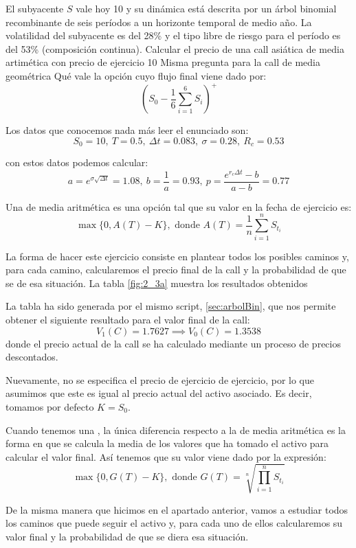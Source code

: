 \begin{problem}[3]
El subyacente $S$ vale hoy 10 y su dinámica está descrita por un árbol binomial recombinante de seis períodos a un horizonte temporal de medio año. La volatilidad del subyacente es del 28\% y el tipo libre de riesgo para el período es del 53\% (composición continua).
\ppart Calcular el precio de una call asiática de media artimética con precio de ejercicio 10
\ppart Misma pregunta para la call de media geométrica
\ppart Qué vale la opción cuyo flujo final viene dado por:
\[\left(S_0-\frac{1}{6}\sum_{i=1}^6S_i\right)^+\]
\solution



Los datos que conocemos nada más leer el enunciado son:
\[S_0=10, \ T=0.5, \ Δt = 0.083, \ σ=0.28, \ R_c=0.53\]

con estos datos podemos calcular:
\[a=e^{σ\sqrt{Δt}} = 1.08, \ b = \frac{1}{a} = 0.93, \ p = \frac{e^{r_cΔt}-b}{a-b}=0.77\]

\spart

Una  de media aritmética es una opción tal que su valor en la fecha de ejercicio es:
\[\max\{0, A(T)-K\}, \text{ donde } A(T) = \frac{1}{n} \sum_{i=1}^nS_{t_i}\]

La forma de hacer este ejercicio consiste en plantear todos los posibles caminos y, para cada camino, calcularemos el precio final de la call y la probabilidad de que se de esa situación. La tabla \ref{fig:2_3a} muestra los resultados obtenidos

La tabla ha sido generada por el mismo script, \ref{sec:arbolBin}, que nos permite obtener el siguiente resultado para el valor final de la call:
\[V_1(C) = 1.7627 \implies V_0(C) = 1.3538\]
donde el precio actual de la call se ha calculado mediante un proceso de precios descontados.

\obs Nuevamente, no se especifica el precio de ejercicio de ejercicio, por lo que asumimos que este es igual al precio actual del activo asociado. Es decir, tomamos por defecto $K=S_0$.

\spart

Cuando tenemos una , la única diferencia respecto a la de media aritmética es la forma en que se calcula la media de los valores que ha tomado el activo para calcular el valor final. Así tenemos que su valor viene dado por la expresión:
\[\max\{0, G(T)-K\}, \text{ donde } G(T) = \sqrt[n]{\prod_{i=1}^nS_{t_i}}\]

De la misma manera que hicimos en el apartado anterior, vamos a estudiar todos los caminos que puede seguir el activo y, para cada uno de ellos calcularemos su valor final y la probabilidad de que se diera esa situación.


\end{problem}

